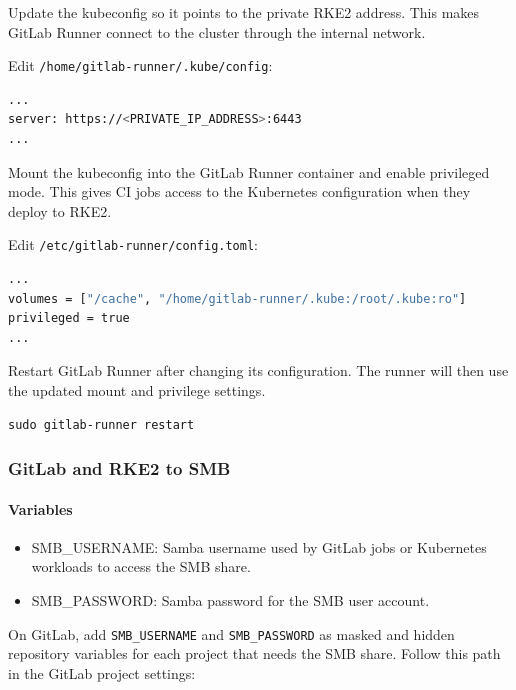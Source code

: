 \documentclass{article}
\begin{document}
Update the kubeconfig so it points to the private RKE2 address. This makes GitLab Runner connect to the cluster through the internal network.

\vspace{0.5cm}

Edit \texttt{/home/gitlab-runner/.kube/config}:
\begin{lstlisting}[language=sh]
...
server: https://<PRIVATE_IP_ADDRESS>:6443
...
\end{lstlisting}

Mount the kubeconfig into the GitLab Runner container and enable privileged mode. This gives CI jobs access to the Kubernetes configuration when they deploy to RKE2.

\vspace{0.5cm}

Edit \texttt{/etc/gitlab-runner/config.toml}:
\begin{lstlisting}[language=sh]
...
volumes = ["/cache", "/home/gitlab-runner/.kube:/root/.kube:ro"]
privileged = true
...
\end{lstlisting}

Restart GitLab Runner after changing its configuration. The runner will then use the updated mount and privilege settings.

\begin{lstlisting}
sudo gitlab-runner restart
\end{lstlisting}

\vspace{0.4cm}
\subsubsection{GitLab and RKE2 to SMB}

\paragraph{Variables}
\begin{itemize}
	\item SMB\_USERNAME: Samba username used by GitLab jobs or Kubernetes workloads to access the SMB share.
	\item SMB\_PASSWORD: Samba password for the SMB user account.
\end{itemize}

On GitLab, add \texttt{SMB\_USERNAME} and \texttt{SMB\_PASSWORD} as masked and hidden repository variables for each project that needs the SMB share. Follow this path in the GitLab project settings:
\end{document}
